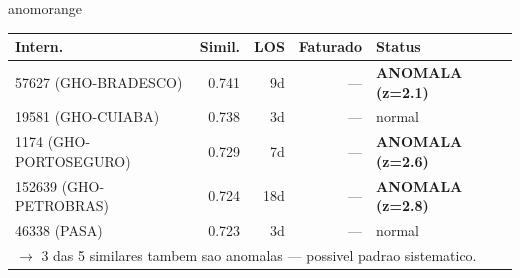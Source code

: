 \documentclass[a4paper,10pt]{article}
\begin{document}
\begin{anomalycard}[Internacao 166749 | GHO-PETROBRAS | ALTO (z=4.53)]{anomorange}
\begin{tabular}{l r r r l}\toprule\textbf{Intern.} & \textbf{Simil.} & \textbf{LOS} & \textbf{Faturado} & \textbf{Status} \\\midrule
57627 (GHO-BRADESCO) & 0.741 & 9d & --- & \textcolor{anomred}{\textbf{ANOMALA (z=2.1)}} \\
19581 (GHO-CUIABA) & 0.738 & 3d & --- & \textcolor{jcubeblue}{normal} \\
1174 (GHO-PORTOSEGURO) & 0.729 & 7d & --- & \textcolor{anomred}{\textbf{ANOMALA (z=2.6)}} \\
152639 (GHO-PETROBRAS) & 0.724 & 18d & --- & \textcolor{anomred}{\textbf{ANOMALA (z=2.8)}} \\
46338 (PASA) & 0.723 & 3d & --- & \textcolor{jcubeblue}{normal} \\
\multicolumn{5}{l}{\textcolor{anomred}{\small $\rightarrow$ 3 das 5 similares tambem sao anomalas --- possivel padrao sistematico.}} \\
\bottomrule\end{tabular}



\end{anomalycard}

\newpage
\end{document}
